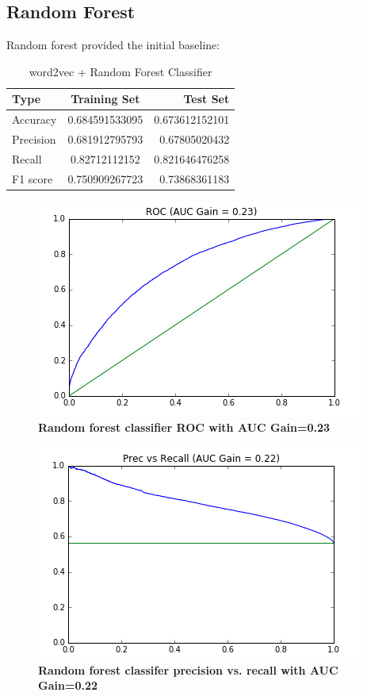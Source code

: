 \documentclass{sig-alternate-05-2015}
\begin{document}
	\subsection{Random Forest}
	Random forest provided the initial baseline:
	\begin{table}[h!]
		\begin{center}
			\caption{word2vec + Random Forest Classifier}
			\label{tab:table1}
			\begin{tabular}{l|c|r} %
				\textbf{Type} & \textbf{Training Set} & \textbf{Test Set}\\
				\hline
				Accuracy & 0.684591533095 & 0.673612152101 \\
				Precision & 0.681912795793 & 0.67805020432 \\
				Recall & 0.82712112152  & 0.821646476258\\
				F1 score & 0.750909267723 & 0.73868361183
			\end{tabular}
		\end{center}
	\end{table}
	
	
	\begin{figure}[H]
		\centering\includegraphics[scale=0.55]{ROC_rf} 
		\caption{\textbf{ Random forest classifier ROC with AUC Gain=0.23 }}
	\end{figure}
	
	
	\begin{figure}[H]
		\centering\includegraphics[scale=0.55]{prrc_rf} 
		\caption{\textbf{ Random forest classifer precision vs. recall with AUC Gain=0.22 }}
	\end{figure}
	
\end{document}
